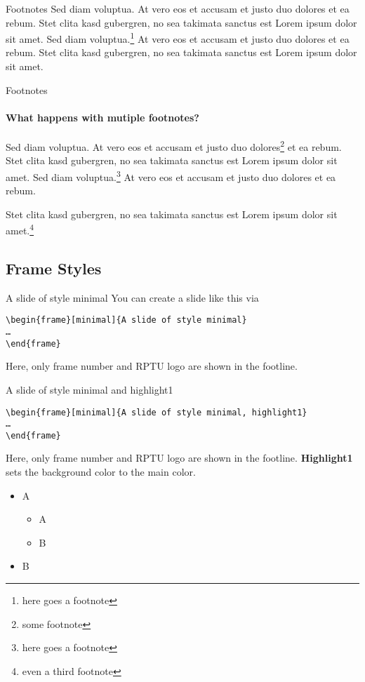 \begin{frame}{Footnotes}
	Sed diam voluptua. At vero eos et accusam et justo duo dolores et ea rebum. Stet clita kasd gubergren, no sea takimata sanctus est Lorem ipsum dolor sit amet. Sed diam voluptua.\footnote{here goes a footnote} At vero eos et accusam et justo duo dolores et ea rebum. Stet clita kasd gubergren, no sea takimata sanctus est Lorem ipsum dolor sit amet.
\end{frame}

\begin{frame}{Footnotes}
	\framesubtitle{What happens with mutiple footnotes?}
	Sed diam voluptua. At vero eos et accusam et justo duo dolores\footnote{some footnote} et ea rebum. Stet clita kasd gubergren, no sea takimata sanctus est Lorem ipsum dolor sit amet. Sed diam voluptua.\footnote{here goes a footnote} At vero eos et accusam et justo duo dolores et ea rebum. 
	
	Stet clita kasd gubergren, no sea takimata sanctus est Lorem ipsum dolor sit amet.\footnote{even a third footnote}
\end{frame}


\subsection{Frame Styles}
\rptusectionpage 

\begin{frame}[minimal]{A slide of style {\selectfont minimal}}
	You can create a slide like this via 
	
	\texttt{\textbackslash begin\{frame\}[minimal]\{A slide of style minimal\}\\ \dots\\ \textbackslash end\{frame\}
	}
	
	Here, only frame number and RPTU logo are shown in the footline.
\end{frame}

\begin{frame}{A slide of style {\selectfont minimal and highlight1}}

\texttt{\textbackslash begin\{frame\}[minimal]\{A slide of style minimal, highlight1\}\\ \dots \\ \textbackslash end\{frame\}
	}
	
	\vspace{1ex}
	
	Here, only frame number and RPTU logo are shown in the footline. \textbf{Highlight1} sets the background color to the main color.
	\begin{itemize}
		\item A \begin{itemize}
			\item A
			\item B
		\end{itemize}
		\item B
	\end{itemize}
\end{frame}

